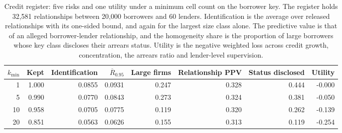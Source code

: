 \begin{table}[t]
\centering
\caption{Credit register: five risks and one utility under a minimum cell count on the borrower key. The register holds 32{,}581 relationships between 20{,}000 borrowers and 60 lenders. Identification is the average over released relationships with its one-sided bound, and again for the largest size class alone. The predictive value is that of an alleged borrower-lender relationship, and the homogeneity share is the proportion of large borrowers whose key class discloses their arrears status. Utility is the negative weighted loss across credit growth, concentration, the arrears ratio and lender-level supervision.}
\label{tab:credit}
\small
\begin{tabular}{rrrrrrrr}
\toprule
$k_{\min}$ & Kept & Identification & $\overline{R}_{0.95}$ & Large firms & Relationship PPV & Status disclosed & Utility \\
\midrule
1 & 1.000 & 0.0855 & 0.0931 & 0.247 & 0.328 & 0.444 & -0.000 \\
5 & 0.990 & 0.0770 & 0.0843 & 0.273 & 0.324 & 0.381 & -0.050 \\
10 & 0.958 & 0.0705 & 0.0775 & 0.119 & 0.320 & 0.262 & -0.139 \\
20 & 0.851 & 0.0563 & 0.0626 & 0.155 & 0.313 & 0.119 & -0.254 \\
\bottomrule
\end{tabular}
\end{table}
